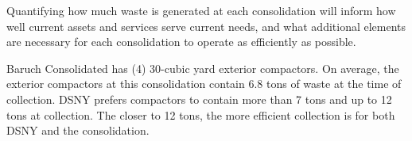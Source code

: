 
    Quantifying how much waste is generated at each consolidation will inform how well current assets and services serve current needs, and what additional elements are necessary for each consolidation to operate as efficiently as possible.
    
    Baruch Consolidated has (4) 30-cubic yard exterior compactors. On average, the exterior compactors at this consolidation contain 6.8 tons of waste at the time of collection. DSNY prefers compactors to contain more than 7 tons and up to 12 tons at collection. The closer to 12 tons, the more efficient collection is for both DSNY and the consolidation.